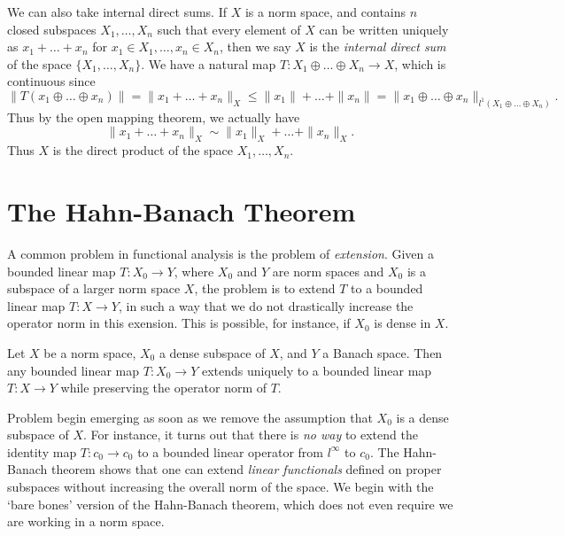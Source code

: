 We can also take internal direct sums. If $X$ is a norm space, and contains $n$ closed subspaces $X_1, \dots, X_n$ such that every element of $X$ can be written uniquely as $x_1 + \dots + x_n$ for $x_1 \in X_1, \dots, x_n \in X_n$, then we say $X$ is the \emph{internal direct sum} of the space $\{ X_1, \dots, X_n \}$. We have a natural map $T: X_1 \oplus \dots \oplus X_n \to X$, which is continuous since
%
\[ \| T(x_1 \oplus \dots \oplus x_n) \| = \| x_1 + \dots + x_n \|_X \leq \| x_1 \| + \dots + \| x_n \| = \| x_1 \oplus \dots \oplus x_n \|_{l^1(X_1 \oplus \dots \oplus X_n)}. \]
%
Thus by the open mapping theorem, we actually have
%
\[ \| x_1 + \dots + x_n \|_X \sim \| x_1 \|_X + \dots + \| x_n \|_X. \]
%
Thus $X$ is the direct product of the space $X_1, \dots, X_n$.

\section{The Hahn-Banach Theorem}

A common problem in functional analysis is the problem of \emph{extension}. Given a bounded linear map $T: X_0 \to Y$, where $X_0$ and $Y$ are norm spaces and $X_0$ is a subspace of a larger norm space $X$, the problem is to extend $T$ to a bounded linear map $T: X \to Y$, in such a way that we do not drastically increase the operator norm in this exension. This is possible, for instance, if $X_0$ is dense in $X$.

\begin{lemma}
    Let $X$ be a norm space, $X_0$ a dense subspace of $X$, and $Y$ a Banach space. Then any bounded linear map $T: X_0 \to Y$ extends uniquely to a bounded linear map $T: X \to Y$ while preserving the operator norm of $T$.
\end{lemma}

Problem begin emerging as soon as we remove the assumption that $X_0$ is a dense subspace of $X$. For instance, it turns out that there is \emph{no way} to extend the identity map $T: c_0 \to c_0$ to a bounded linear operator from $l^\infty$ to $c_0$. The Hahn-Banach theorem shows that one can extend \emph{linear functionals} defined on proper subspaces without increasing the overall norm of the space. We begin with the `bare bones' version of the Hahn-Banach theorem, which does not even require we are working in a norm space.


